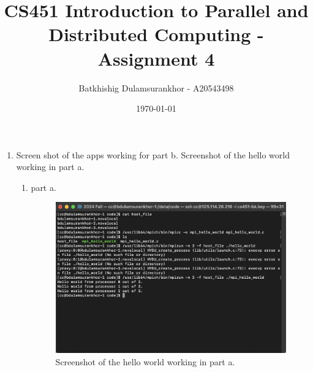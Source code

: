 \documentclass{article}
\title{CS451 Introduction to Parallel and Distributed Computing - Assignment 4}
\author{Batkhishig Dulamsurankhor - A20543498}
\date{\today} %
\begin{document}
\maketitle

\begin{enumerate}
  \item Screen shot of the apps working for part b. Screenshot of the hello world working in part a.
  \begin{enumerate}
    \item part a.
    \begin{figure}[H]
      \centering
      \includegraphics[width=\textwidth]{image2.png}
      \caption{Screenshot of the hello world working in part a.}
    \end{figure}
    

\end{enumerate}
\end{enumerate}
\end{document}
